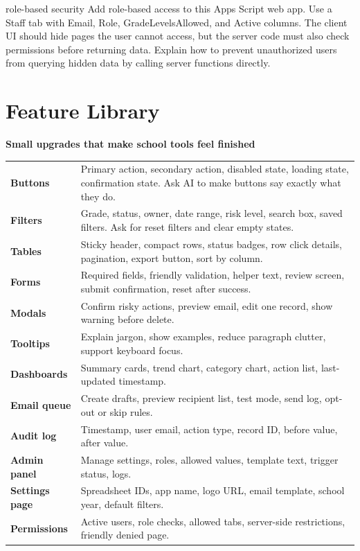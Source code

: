 \documentclass[10pt]{article}
\newcommand{\sectionkicker}[1]{\vspace{0.2em}{\small\bfseries\color{GCTeal}#1}\vspace{-0.15em}}
\newcommand{\tighttitle}[1]{{\Large\bfseries\color{GCNavy}#1}\par}
\begin{document}
\begin{promptbox}{role-based security}
Add role-based access to this Apps Script web app. Use a Staff tab with Email, Role, GradeLevelsAllowed, and Active columns. The client UI should hide pages the user cannot access, but the server code must also check permissions before returning data. Explain how to prevent unauthorized users from querying hidden data by calling server functions directly.
\end{promptbox}

\section{Feature Library}
\sectionkicker{ASK FOR FEATURES BY NAME}
\tighttitle{Small upgrades that make school tools feel finished}

\begin{longtable}{p{}p{}}
\textbf{Buttons} & Primary action, secondary action, disabled state, loading state, confirmation state. Ask AI to make buttons say exactly what they do. \\
\textbf{Filters} & Grade, status, owner, date range, risk level, search box, saved filters. Ask for reset filters and clear empty states. \\
\textbf{Tables} & Sticky header, compact rows, status badges, row click details, pagination, export button, sort by column. \\
\textbf{Forms} & Required fields, friendly validation, helper text, review screen, submit confirmation, reset after success. \\
\textbf{Modals} & Confirm risky actions, preview email, edit one record, show warning before delete. \\
\textbf{Tooltips} & Explain jargon, show examples, reduce paragraph clutter, support keyboard focus. \\
\textbf{Dashboards} & Summary cards, trend chart, category chart, action list, last-updated timestamp. \\
\textbf{Email queue} & Create drafts, preview recipient list, test mode, send log, opt-out or skip rules. \\
\textbf{Audit log} & Timestamp, user email, action type, record ID, before value, after value. \\
\textbf{Admin panel} & Manage settings, roles, allowed values, template text, trigger status, logs. \\
\textbf{Settings page} & Spreadsheet IDs, app name, logo URL, email template, school year, default filters. \\
\textbf{Permissions} & Active users, role checks, allowed tabs, server-side restrictions, friendly denied page. \\
\end{longtable}
\end{document}
